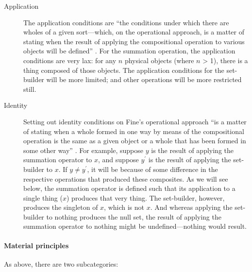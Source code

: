 \documentclass[11pt]{article}
\begin{document}
\begin{spacing}{1.5}
\begin{description}
  \item[Application] The application conditions are ``the conditions
    under which there are wholes of a given sort---which, on the
    operational approach, is a matter of stating when the result of
    applying the compositional operation to various objects will be
    defined'' \citep[570]{fine2010}.  For the summation operation, the
    application conditions are very lax: for any $n$ physical objects
    (where $n$ \textgreater{} 1), there is a thing composed of those
    objects.  The application conditions for the set-builder will be
    more limited; and other operations will be more restricted
    still. \label{fine-app}
  \item[Identity] Setting out identity conditions on Fine's
    operational approach ``is a matter of stating when a whole formed
    in one way by means of the compositional operation is the same as
    a given object or a whole that has been formed in some other way''
    \citeyearpar[570]{fine2010}.  For example, suppose $y$ is the
    result of applying the summation operator to $x$, and suppose
    $y^\prime$ is the result of applying the set-builder to $x$.  If
    $y \neq y^\prime$, it will be because of some difference in the
    respective operations that produced these composites.  As we will
    see below, the summation operator is defined such that its
    application to a single thing ($x$) produces that very thing.  The
    set-builder, however, produces the singleton of $x$, which is not
    $x$.  And whereas applying the set-builder to nothing produces the
    null set, the result of applying the summation operator to nothing
    might be undefined---nothing would result.
\end{description}

\paragraph{Material principles}
\label{material}
As above, there are two subcategories:


\end{spacing}
\end{document}
